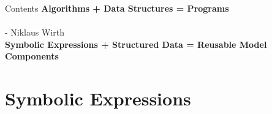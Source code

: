 \documentclass[smaller]{beamer}
\begin{document}
\begin{frame}{Contents}
  \textbf{Algorithms + Data Structures = Programs}\\
  ~\\
  - Niklaus Wirth\\
  \small\textbf{Symbolic Expressions + Structured Data = Reusable Model Components}\\ 
\end{frame}
  






\section{Symbolic Expressions}
\begin{comment}
\subsection{Expressions}
\begin{frame}{Symbolic Expressions}
  In Rima, the objective and constraints are stored as symbolic expressions\\
  ~\\
  Expressions and data are combined and into matrix rows at solve time
  \\
  ~\\
  \begin{itemize}
    \item dedicated modelling languages tend to do the same
    \item some ``mainstream language'' bindings directly construct matrix rows
 \end{itemize}
\end{frame}
\end{comment}
\end{document}
